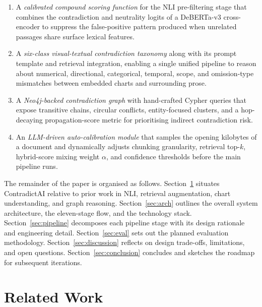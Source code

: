 \documentclass[conference]{IEEEtran}
\begin{document}
\begin{enumerate}
    \item A \emph{calibrated compound scoring function} for the NLI pre-filtering stage that combines the contradiction and neutrality logits of a DeBERTa-v3 cross-encoder to suppress the false-positive pattern produced when unrelated passages share surface lexical features.
    \item A \emph{six-class visual-textual contradiction taxonomy} along with its prompt template and retrieval integration, enabling a single unified pipeline to reason about numerical, directional, categorical, temporal, scope, and omission-type mismatches between embedded charts and surrounding prose.
    \item A \emph{Neo4j-backed contradiction graph} with hand-crafted Cypher queries that expose transitive chains, circular conflicts, entity-focused clusters, and a hop-decaying propagation-score metric for prioritising indirect contradiction risk.
    \item An \emph{LLM-driven auto-calibration module} that samples the opening kilobytes of a document and dynamically adjusts chunking granularity, retrieval top-$k$, hybrid-score mixing weight $\alpha$, and confidence thresholds before the main pipeline runs.
\end{enumerate}
The remainder of the paper is organised as follows. Section~\ref{sec:related} situates ContradictAI relative to prior work in NLI, retrieval augmentation, chart understanding, and graph reasoning. Section~\ref{sec:arch} outlines the overall system architecture, the eleven-stage flow, and the technology stack. Section~\ref{sec:pipeline} decomposes each pipeline stage with its design rationale and engineering detail. Section~\ref{sec:eval} sets out the planned evaluation methodology. Section~\ref{sec:discussion} reflects on design trade-offs, limitations, and open questions. Section~\ref{sec:conclusion} concludes and sketches the roadmap for subsequent iterations.
\section{Related Work}\label{sec:related}
\end{document}
